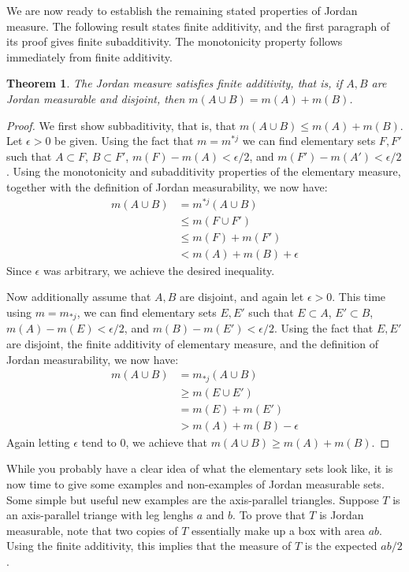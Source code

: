 \documentclass[11pt,oneside]{amsbook}
\theoremstyle{definition}
\theoremstyle{plain}
\newtheorem{thm}{Theorem}[section]
\theoremstyle{definition}
\theoremstyle{remark}
\numberwithin{equation}{section}
\numberwithin{figure}{section}
\begin{document}
We are now ready to establish the remaining stated properties of Jordan measure. The following result states finite additivity, and the first paragraph of its proof gives finite subadditivity. The monotonicity property follows immediately from finite additivity.

\begin{thm}
  The Jordan measure satisfies finite additivity, that is, if $A,B$ are Jordan measurable and disjoint, then $m(A\cup B)=m(A)+m(B)$.
\end{thm}

\begin{proof}
  We first show subbaditivity, that is, that $m(A\cup B)\leq m(A)+m(B)$. Let $\epsilon>0$ be given. Using the fact that $m=m^{*j}$ we can find elementary sets $F,F'$ such that $A\subset F$, $B\subset F'$, $m(F)-m(A)<\epsilon/2$, and $m(F')-m(A')<\epsilon/2$. Using the monotonicity and subadditivity properties of the elementary measure, together with the definition of Jordan measurability, we now have:
  \begin{align*}
    m(A\cup B)&=m^{*j}(A\cup B)\\
              &\leq m(F\cup F')\\
              &\leq m(F)+m(F')\\
              &<m(A)+m(B)+\epsilon
  \end{align*}
  Since $\epsilon$ was arbitrary, we achieve the desired inequality.
  
  Now additionally assume that $A,B$ are disjoint, and again let $\epsilon>0$. This time using $m=m_{*j}$, we can find elementary sets $E,E'$ such that $E\subset A$, $E'\subset B$, $m(A)-m(E)<\epsilon/2$, and $m(B)-m(E')<\epsilon/2$. Using the fact that $E,E'$ are disjoint, the finite additivity of elementary measure, and the definition of Jordan measurability, we now have:
  \begin{align*}
    m(A\cup B)&=m_{*j}(A\cup B)\\
              &\geq m(E\cup E')\\
              &=m(E)+m(E')\\
              &>m(A)+m(B)-\epsilon
  \end{align*}
  Again letting $\epsilon$ tend to $0$, we achieve that $m(A\cup B)\geq m(A)+m(B)$.
\end{proof}

While you probably have a clear idea of what the elementary sets look like, it is now time to give some examples and non-examples of Jordan measurable sets. Some simple but useful new examples are the axis-parallel triangles. Suppose $T$ is an axis-parallel triange with leg lenghs $a$ and $b$. To prove that $T$ is Jordan measurable, note that two copies of $T$ essentially make up a box with area $ab$. Using the finite additivity, this implies that the measure of $T$ is the expected $ab/2$.
\end{document}
